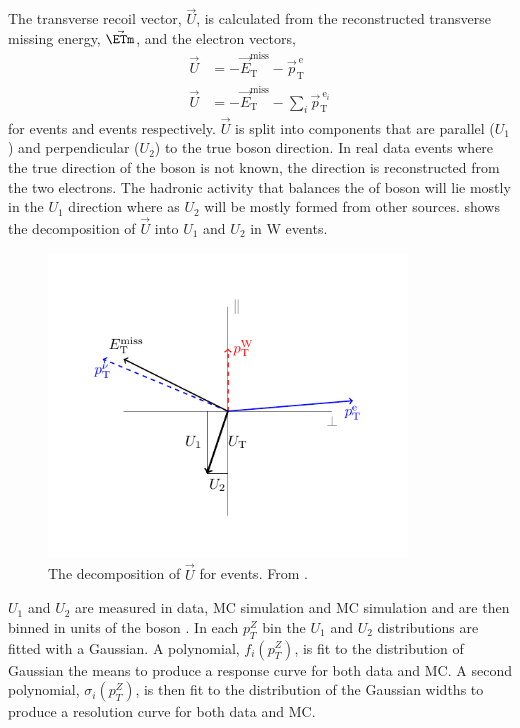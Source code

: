 The transverse recoil vector, $\vec{U}$, is calculated from the reconstructed
transverse missing energy, $\vec{\ETm}$, and the electron \pT vectors,
\begin{align}
\vec{U} &= - \vec{E}_{\mathrm{T}}^{\mathrm{miss}} 
      - \vec{p}^{\ \mathrm{e}}_{\mathrm{T}}\\
\vec{U} &= - \vec{E}_{\mathrm{T}}^{\mathrm{miss}} 
      - \sum_i \vec{p}^{\ \mathrm{e}_i}_{\mathrm{T}}
\end{align}
for \PW events and \PZ events respectively. $\vec{U}$ is split into components
that are parallel ($U_1$) and perpendicular ($U_2$) to the true boson \pT
direction. 
In real \PZ data events where the true direction of the boson \pT is not known,
the \pT direction is reconstructed from the two electrons.
The hadronic activity that balances the \pT of boson will lie mostly in the
$U_1$ direction where as $U_2$ will be mostly formed from other sources.
 shows the decomposition of $\vec{U}$ into $U_1$ and
$U_2$ in W events.
\begin{figure}
  \begin{center}
    \includegraphics*[width=0.85\textwidth]{recoil}
    \caption{The decomposition of $\vec{U}$ for \PW events. From \cite{recoil}.}
    \label{fig:recoil}
  \end{center}
\end{figure}

$U_1$ and $U_2$ are measured in \PZ data, \PZ \ac{MC} simulation and \PW \ac{MC}
simulation and are then binned in units of the boson \pT.  In each $p_T^{Z}$ bin
the $U_1$ and $U_2$ distributions are fitted with a Gaussian.  A polynomial,
$f_i(p_T^Z)$, is fit to the distribution of Gaussian the means to produce a
response curve for both data and \ac{MC}.  A second polynomial,
$\sigma_i(p_T^Z)$, is then fit to the distribution of the Gaussian widths to
produce a resolution curve for both data and \ac{MC}.

